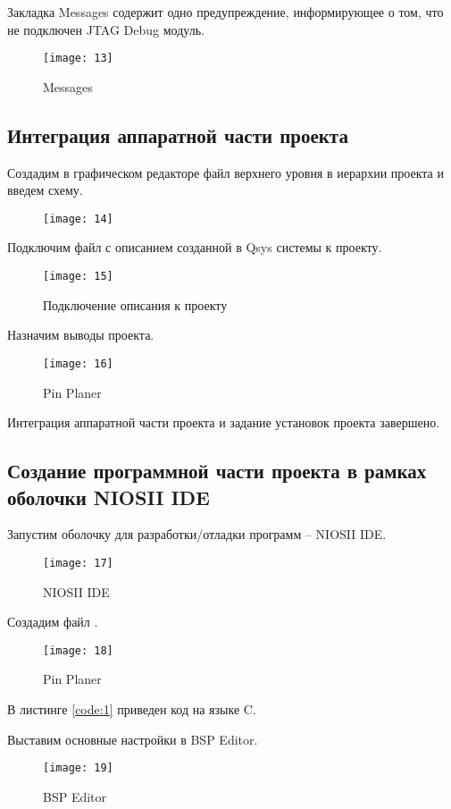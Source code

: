 Закладка Messages содержит одно предупреждение, информирующее о том, что не подключен JTAG Debug модуль.
\begin{figure}[H]
	\centering
	\texttt{[image: 13]}
	\caption{Messages}
\end{figure}

\subsection{Интеграция аппаратной части проекта}

Создадим в графическом редакторе файл верхнего уровня в иерархии проекта и введем схему.
\begin{figure}[H]
	\centering
	\texttt{[image: 14]}
	\caption{}
\end{figure}

Подключим файл с описанием созданной в Qsys системы к проекту.
\begin{figure}[H]
	\centering
	\texttt{[image: 15]}
	\caption{Подключение описания к проекту}
\end{figure}

Назначим выводы проекта.
\begin{figure}[H]
	\centering
	\texttt{[image: 16]}
	\caption{Pin Planer}
\end{figure}

Интеграция аппаратной части проекта и задание установок проекта завершено.

\subsection{Создание программной части проекта в рамках оболочки NIOSII IDE}

Запустим оболочку для разработки/отладки программ -- NIOSII IDE.
\begin{figure}[H]
	\centering
	\texttt{[image: 17]}
	\caption{NIOSII IDE}
\end{figure}

Создадим файл .
\begin{figure}[H]
	\centering
	\texttt{[image: 18]}
	\caption{Pin Planer}
\end{figure}

В листинге \ref{code:1} приведен код на языке C.


Выставим основные настройки в BSP Editor.
\begin{figure}[H]
	\centering
	\texttt{[image: 19]}
	\caption{BSP Editor}
\end{figure}

